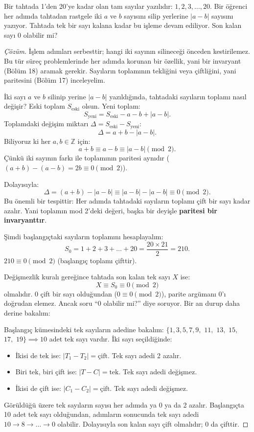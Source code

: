 \begin{example}
Bir tahtada 1'den 20'ye kadar olan tam sayılar yazılıdır: $1, 2, 3, \dots, 20$. Bir öğrenci her adımda tahtadan rastgele iki $a$ ve $b$ sayısını silip yerlerine $|a - b|$ sayısını yazıyor. Tahtada tek bir sayı kalana kadar bu işleme devam ediliyor. Son kalan sayı $0$ olabilir mi?
\end{example}

\begin{proof}[Çözüm]
İşlem adımları serbesttir; hangi iki sayının silineceği önceden kestirilemez. Bu tür süreç problemlerinde her adımda korunan bir özellik, yani bir invaryant (Bölüm 18) aramak gerekir. Sayıların toplamının tekliğini veya çiftliğini, yani paritesini (Bölüm 17) inceleyelim.

İki sayı $a$ ve $b$ silinip yerine $|a - b|$ yazıldığında, tahtadaki sayıların toplamı nasıl değişir?
Eski toplam $S_{\text{eski}}$ olsun. Yeni toplam:
\[
S_{\text{yeni}} = S_{\text{eski}} - a - b + |a - b|.
\]
Toplamdaki değişim miktarı $\Delta = S_{\text{eski}} - S_{\text{yeni}}$:
\[
\Delta = a + b - |a - b|.
\]
Biliyoruz ki her $a, b \in \mathbb{Z}$ için:
\[
a + b \equiv a - b \equiv |a - b| \pmod 2.
\]
Çünkü iki sayının farkı ile toplamının paritesi aynıdır ($(a+b) - (a-b) = 2b \equiv 0 \pmod 2$).

Dolayısıyla:
\[
\Delta = (a + b) - |a - b| \equiv |a - b| - |a - b| \equiv 0 \pmod 2.
\]
Bu önemli bir tespittir: Her adımda tahtadaki sayıların toplamı çift bir sayı kadar azalır. Yani toplamın mod 2'deki değeri, başka bir deyişle \textbf{paritesi bir invaryanttır}.

Şimdi başlangıçtaki sayıların toplamını hesaplayalım:
\[
S_0 = 1 + 2 + 3 + \dots + 20 = \frac{20 \times 21}{2} = 210.
\]
$210 \equiv 0 \pmod 2$ (başlangıç toplamı çifttir).

Değişmezlik kuralı gereğince tahtada son kalan tek sayı $X$ ise:
\[
X \equiv S_0 \equiv 0 \pmod 2
\]
olmalıdır. $0$ çift bir sayı olduğundan ($0 \equiv 0 \pmod 2$), parite argümanı $0$'ı doğrudan elemez. Ancak soru ``0 olabilir mi?'' diye soruyor. Bir an durup daha derine bakalım:

Başlangıç kümesindeki tek sayıların adedine bakalım:
$\{1, 3, 5, 7, 9,$ $11,$ $13,$ $15,$ $17,$ $19\} \implies 10$ adet tek sayı vardır.
İki sayı seçildiğinde:
\begin{itemize}
    \item İkisi de tek ise: $|T_1 - T_2| = \text{çift}$. Tek sayı adedi 2 azalır.
    \item Biri tek, biri çift ise: $|T - C| = \text{tek}$. Tek sayı adedi değişmez.
    \item İkisi de çift ise: $|C_1 - C_2| = \text{çift}$. Tek sayı adedi değişmez.
\end{itemize}
Görüldüğü üzere tek sayıların sayısı her adımda ya 0 ya da 2 azalır. Başlangıçta 10 adet tek sayı olduğundan, adımların sonucunda tek sayı adedi $10 \to 8 \to \dots \to 0$ olabilir. Dolayısıyla son kalan sayı çift olmalıdır; 0 da çifttir.


\end{proof}
